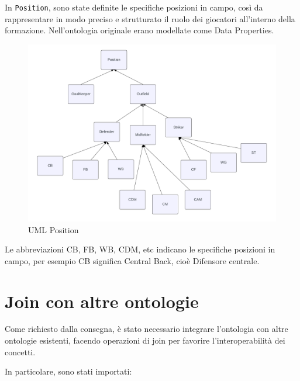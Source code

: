\documentclass[11pt]{report} %
\begin{document}
\begin{itemize}
    In \texttt{Position}, sono state definite le  specifiche posizioni in campo, così da rappresentare in modo preciso e strutturato il ruolo dei giocatori all'interno della formazione. Nell'ontologia originale erano modellate come Data Properties.
    \begin{figure}[H]
        \centering
        \includegraphics[width=1\linewidth]{POSITION.png}
        \caption{UML Position}
    \end{figure}
    \hspace{2cm}

    Le abbreviazioni CB, FB, WB, CDM, etc indicano le specifiche posizioni in campo, per esempio CB significa Central Back, cioè Difensore centrale.
 \end{itemize}
\newpage

\section{Join con altre ontologie}

Come richiesto dalla consegna, è stato necessario integrare l'ontologia con altre ontologie esistenti, facendo operazioni di join per favorire l'interoperabilità dei concetti.

In particolare, sono stati importati:
\end{document}
